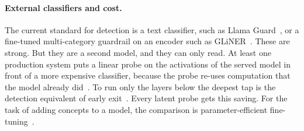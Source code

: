\documentclass[11pt]{article}
\begin{document}
\paragraph{External classifiers and cost.}
The current standard for detection is a text classifier, such as Llama Guard~\citep{inan2023llamaguard},
or a fine-tuned multi-category guardrail on an encoder such as GLiNER~\citep{zaratiana2023gliner}. These
are strong. But they are a second model, and they can only read. At least one production system puts a linear probe on the activations of the served model in front of a more expensive classifier, because the probe re-uses computation that the model already did~\citep{cunningham2026ccpp}. To run only the layers below the deepest
tap is the detection equivalent of early exit~\citep{schuster2022calm}. Every latent probe gets this
saving. For the task of adding concepts to a model, the comparison is parameter-efficient
fine-tuning~\citep{houlsby2019adapters,hu2021lora}.
\end{document}
